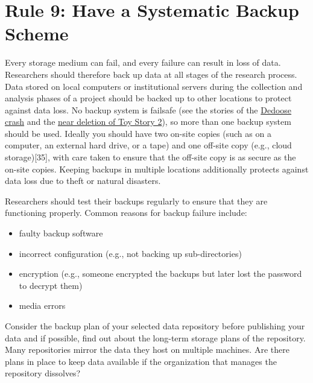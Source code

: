 \documentclass[10pt,letterpaper]{article}
\providecommand{\tightlist}{%
  \setlength{\itemsep}{0pt}\setlength{\parskip}{0pt}
}
\begin{document}
\section*{Rule 9: Have a Systematic Backup
Scheme}\label{rule-9-have-a-systematic-backup-scheme}

Every storage medium can fail, and every failure can result in loss of
data. Researchers should therefore back up data at all stages of the
research process. Data stored on local computers or institutional
servers during the collection and analysis phases of a project should be
backed up to other locations to protect against data loss. No backup
system is failsafe (see the stories of the
\href{https://www.insidehighered.com/news/2014/05/16/dedoose-crash-shows-dangers-handing-data-cloud-services}{Dedoose
crash} and the
\href{http://thenextweb.com/media/2012/05/21/how-pixars-toy-story-2-was-deleted-twice-once-by-technology-and-again-for-its-own-good/}{near
deletion of Toy Story 2}), so more than one backup system should be
used. Ideally you should have two on-site copies (such as on a computer,
an external hard drive, or a tape) and one off-site copy (e.g., cloud
storage){[}35{]}, with care taken to ensure that the off-site copy is as
secure as the on-site copies. Keeping backups in multiple locations
additionally protects against data loss due to theft or natural
disasters.

Researchers should test their backups regularly to ensure that they are
functioning properly. Common reasons for backup failure include:

\begin{itemize}
\tightlist
\item
  faulty backup software
\item
  incorrect configuration (e.g., not backing up sub-directories)
\item
  encryption (e.g., someone encrypted the backups but later lost the
  password to decrypt them)
\item
  media errors
\end{itemize}

Consider the backup plan of your selected data repository before
publishing your data and if possible, find out about the long-term
storage plans of the repository. Many repositories mirror the data they
host on multiple machines. Are there plans in place to keep data
available if the organization that manages the repository dissolves?
\end{document}
